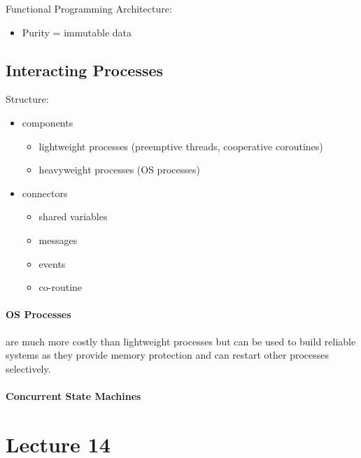 \documentclass{article}
\begin{document}
Functional Programming Architecture:
\begin{itemize}
    \item Purity = immutable data
\end{itemize}
\subsection*{Interacting Processes} %
\label{sub:interacting_processes}
Structure:
\begin{itemize}
    \item components
    \begin{itemize}
        \item lightweight processes (preemptive threads, cooperative coroutines)
        \item heavyweight processes (OS processes)
    \end{itemize}
    \item connectors
    \begin{itemize}
        \item shared variables
        \item messages
        \item events
        \item co-routine 
    \end{itemize}
\end{itemize}

\paragraph{OS Processes} %
\label{par:os_processes}
are much more costly than lightweight processes but can be used to build reliable systems as they provide memory protection and can restart other processes selectively.

\paragraph{Concurrent State Machines} %
\label{par:concurrent_state_machines}









\section*{Lecture 14} %
\label{sec:lecture_14}
\end{document}
